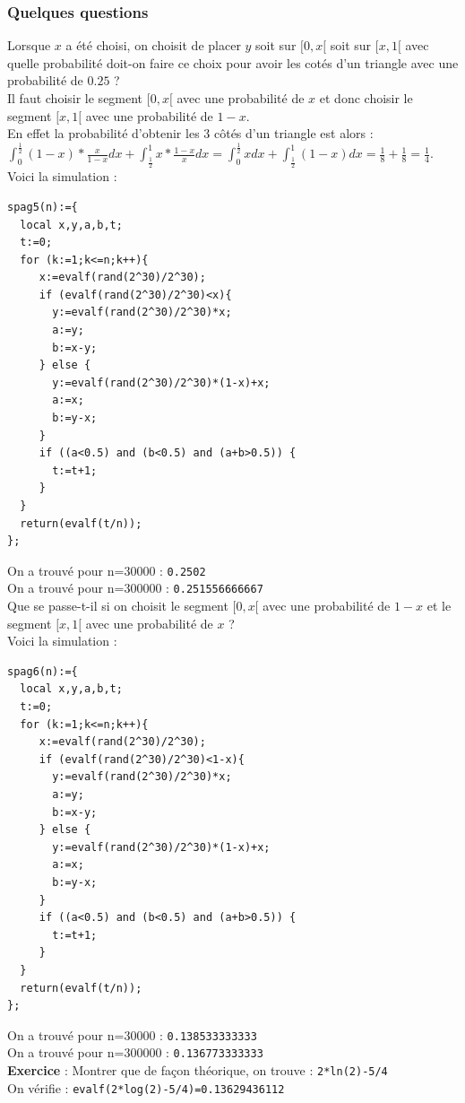\documentclass[a4paper,11pt]{book}
\begin{document}
\subsubsection{Quelques questions}
Lorsque $x$ a \'et\'e choisi, on choisit de placer $y$ soit sur  $[0,x[$ soit
 sur $[x,1[$ 
avec quelle probabilit\'e doit-on faire ce choix pour avoir les cot\'es d'un 
triangle avec une probabilit\'e de $0.25$ ?\\
Il faut choisir le segment $[0,x[$ avec une probabilit\'e de $x$ et donc 
choisir le segment $[x,1[$ avec une probabilit\'e de $1-x$.\\
En effet la probabilit\'e d'obtenir les 3 c\^ot\'es d'un triangle est alors :\\
$\displaystyle \int_0^{\frac{1}{2}}(1-x)*\frac{x}{1-x}dx+\int_{\frac{1}{2}}^1x*\frac{1-x}{x}dx=
\int_0^{\frac{1}{2}}xdx+\int_{\frac{1}{2}}^1(1-x)dx=\frac{1}{8}+\frac{1}{8}=\frac{1}{4}$.\\
Voici la simulation :
\begin{verbatim}
spag5(n):={
  local x,y,a,b,t;
  t:=0;
  for (k:=1;k<=n;k++){
     x:=evalf(rand(2^30)/2^30);
     if (evalf(rand(2^30)/2^30)<x){
       y:=evalf(rand(2^30)/2^30)*x;
       a:=y;
       b:=x-y;
     } else {
       y:=evalf(rand(2^30)/2^30)*(1-x)+x;
       a:=x;
       b:=y-x;
     }
     if ((a<0.5) and (b<0.5) and (a+b>0.5)) {
       t:=t+1;
     }
  }
  return(evalf(t/n));
}; 
\end{verbatim}
On a trouv\'e pour n=30000 :
{\tt 0.2502}\\
On a trouv\'e pour n=300000 :
{\tt 0.251556666667}\\

Que se passe-t-il si on choisit le segment $[0,x[$ avec une probabilit\'e de 
$1-x$ et  le segment $[x,1[$ avec une probabilit\'e de $x$ ?\\
Voici la simulation :
\begin{verbatim}
spag6(n):={
  local x,y,a,b,t;
  t:=0;
  for (k:=1;k<=n;k++){
     x:=evalf(rand(2^30)/2^30);
     if (evalf(rand(2^30)/2^30)<1-x){
       y:=evalf(rand(2^30)/2^30)*x;
       a:=y;
       b:=x-y;
     } else {
       y:=evalf(rand(2^30)/2^30)*(1-x)+x;
       a:=x;
       b:=y-x;
     }
     if ((a<0.5) and (b<0.5) and (a+b>0.5)) {
       t:=t+1;
     }
  }
  return(evalf(t/n));
}; 
\end{verbatim}
On a trouv\'e pour n=30000 :
{\tt 0.138533333333}\\
On a trouv\'e pour n=300000 :
{\tt  0.136773333333}\\
{\bf Exercice} : Montrer que de fa\c{c}on th\'eorique, on trouve :
{\tt 2*ln(2)-5/4}\\
On v\'erifie :
{\tt evalf(2*log(2)-5/4)=0.13629436112}
\end{document}
